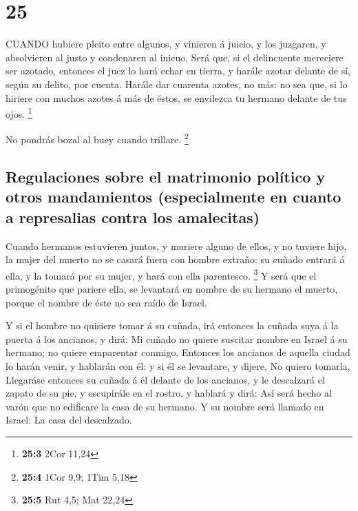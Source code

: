 \hypertarget{section-24}{%
\section{25}\label{section-24}}

 CUANDO hubiere pleito entre algunos, y vinieren á juicio, y
los juzgaren, y absolvieren al justo y condenaren al inicuo,
 Será que, si el delincuente mereciere ser azotado, entonces
el juez lo hará echar en tierra, y harále azotar delante de sí, según su
delito, por cuenta.  Harále dar cuarenta azotes, no más: no
sea que, si lo hiriere con muchos azotes á más de éstos, se envilezca tu
hermano delante de tus ojos. \footnote{\textbf{25:3} 2Cor 11,24}

 No pondrás bozal al buey cuando trillare. \footnote{\textbf{25:4}
  1Cor 9,9; 1Tim 5,18}

\hypertarget{regulaciones-sobre-el-matrimonio-poluxedtico-y-otros-mandamientos-especialmente-en-cuanto-a-represalias-contra-los-amalecitas}{%
\subsection{Regulaciones sobre el matrimonio político y otros
mandamientos (especialmente en cuanto a represalias contra los
amalecitas)}\label{regulaciones-sobre-el-matrimonio-poluxedtico-y-otros-mandamientos-especialmente-en-cuanto-a-represalias-contra-los-amalecitas}}

 Cuando hermanos estuvieren juntos, y muriere alguno de
ellos, y no tuviere hijo, la mujer del muerto no se casará fuera con
hombre extraño: su cuñado entrará á ella, y la tomará por su mujer, y
hará con ella parentesco. \footnote{\textbf{25:5} Rut 4,5; Mat 22,24}
 Y será que el primogénito que pariere ella, se levantará en
nombre de su hermano el muerto, porque el nombre de éste no sea raído de
Israel.

 Y si el hombre no quisiere tomar á su cuñada, irá entonces
la cuñada suya á la puerta á los ancianos, y dirá: Mi cuñado no quiere
suscitar nombre en Israel á su hermano; no quiere emparentar conmigo.
 Entonces los ancianos de aquella ciudad lo harán venir, y
hablarán con él: y si él se levantare, y dijere, No quiero tomarla,
 Llegaráse entonces su cuñada á él delante de los ancianos,
y le descalzará el zapato de su pie, y escupirále en el rostro, y
hablará y dirá: Así será hecho al varón que no edificare la casa de su
hermano.  Y su nombre será llamado en Israel: La casa del
descalzado.

